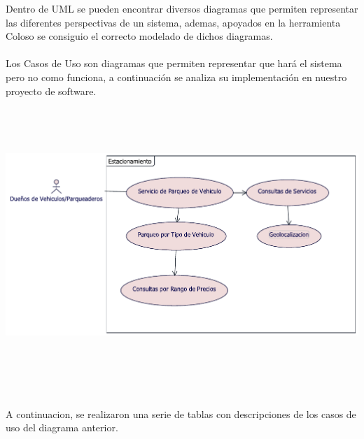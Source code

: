 \newpage
Dentro de UML se pueden encontrar diversos diagramas que permiten representar las diferentes perspectivas de un sistema, ademas, apoyados en la herramienta Coloso se consiguio  el correcto modelado de dichos diagramas.
\\
\\
 Los Casos de Uso son diagramas que permiten representar que hará el sistema pero no como funciona, a continuación se analiza su implementación en nuestro proyecto de software.
\\
\\
\\
\\
\\
\includegraphics[width=1.25\linewidth]{imgs/Imagenes - casos de uso/Diagrama-General-Casos-de-Uso}
\\
\\
\\
\\
\\
\\
A continuacion, se realizaron una serie de tablas con descripciones de los casos de uso del diagrama anterior.
\newpage

